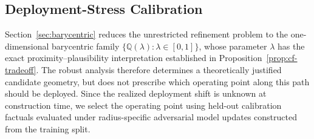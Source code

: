 
\iffalse
\subsection{Deployment-Stress Calibration}
\label{sec:calibration}

Section~\ref{sec:barycentric} reduces the unrestricted refinement problem to the one-dimensional barycentric family $\{\mathbb{Q}(\lambda):\lambda\in[0,1]\}$, whose parameter $\lambda$ has the exact proximity--plausibility interpretation established in Proposition~\ref{prop:cf-tradeoff}.
The robust analysis therefore determines a theoretically justified candidate geometry, but does not prescribe which operating point along this path should be deployed.
Since the realized deployment shift is unknown at construction time, we select the operating point using held-out calibration factuals evaluated under radius-specific adversarial model updates constructed from the training split.



